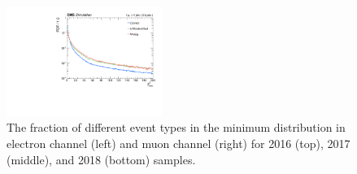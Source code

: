 \begin{figure}[p]
    \includegraphics[width=0.45\textwidth]{figure/bbSep_18_mu_Rate_PDF_bbSep.pdf}
    \caption[The fraction of different event types in the minimum \chisq distribution.]
    {
        The fraction of different event types in the minimum \chisq distribution in electron channel (left) and muon channel (right) for 2016 (top), 2017 (middle), and 2018 (bottom) samples.
    }
    \label{fig:bbsep_rate}
\end{figure}

